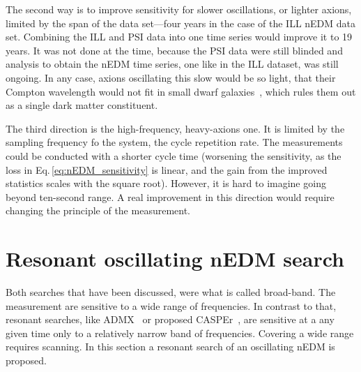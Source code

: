 The second way is to improve sensitivity for slower oscillations, or lighter axions, limited by the span of the data set---four years in the case of the ILL nEDM data set. Combining the ILL and PSI data into one time series would improve it to 19 years. It was not done at the time, because the PSI data were still blinded and analysis to obtain the nEDM time series, one like in the ILL dataset, was still ongoing. In any case, axions oscillating this slow would be so light, that their Compton wavelength would not fit in small dwarf galaxies~\cite{Marsh2015Review}, which rules them out as a single dark matter constituent.

The third direction is the high-frequency, heavy-axions one. It is limited by the sampling frequency fo the system, the cycle repetition rate. The measurements could be conducted with a shorter cycle time (worsening the sensitivity, as the loss in Eq.\,\ref{eq:nEDM_sensitivity} is linear, and the gain from the improved statistics scales with the square root).
However, it is hard to imagine going beyond ten-second range. A real improvement in this direction would require changing the principle of the measurement.




\section{Resonant oscillating nEDM search}
Both searches that have been discussed, were what is called broad-band. The measurement are sensitive to a wide range of frequencies. In contrast to that, resonant searches, like ADMX~\cite{PhysRevLett.104.041301} or proposed CASPEr~\cite{CASPEr2014}, are sensitive at a any given time only to a relatively narrow band of frequencies. Covering a wide range requires scanning. In this section a resonant search of an oscillating nEDM is proposed.


